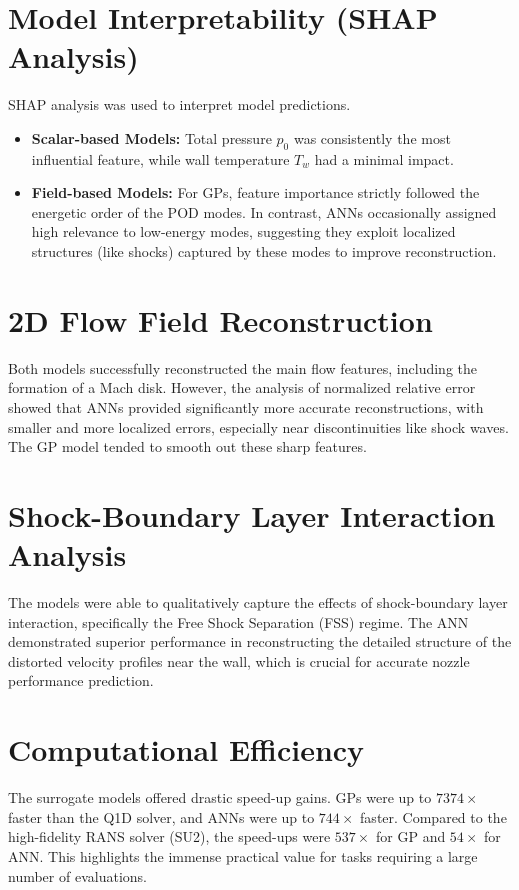 \documentclass[dscexam, EN]{ufabcFHZh}
\begin{document}
\section{Model Interpretability (SHAP Analysis)}
SHAP analysis was used to interpret model predictions.
\begin{itemize}
    \item \textbf{Scalar-based Models:} Total pressure $p_0$ was consistently the most influential feature, while wall temperature $T_w$ had a minimal impact.
    \item \textbf{Field-based Models:} For GPs, feature importance strictly followed the energetic order of the POD modes. In contrast, ANNs occasionally assigned high relevance to low-energy modes, suggesting they exploit localized structures (like shocks) captured by these modes to improve reconstruction.
\end{itemize}

\section{2D Flow Field Reconstruction}
Both models successfully reconstructed the main flow features, including the formation of a Mach disk. However, the analysis of normalized relative error showed that ANNs provided significantly more accurate reconstructions, with smaller and more localized errors, especially near discontinuities like shock waves. The GP model tended to smooth out these sharp features.

\section{Shock-Boundary Layer Interaction Analysis}
The models were able to qualitatively capture the effects of shock-boundary layer interaction, specifically the Free Shock Separation (FSS) regime. The ANN demonstrated superior performance in reconstructing the detailed structure of the distorted velocity profiles near the wall, which is crucial for accurate nozzle performance prediction.

\section{Computational Efficiency}
The surrogate models offered drastic speed-up gains. GPs were up to $7374\times$ faster than the Q1D solver, and ANNs were up to $744\times$ faster. Compared to the high-fidelity RANS solver (SU2), the speed-ups were $537\times$ for GP and $54\times$ for ANN. This highlights the immense practical value for tasks requiring a large number of evaluations.
\end{document}

